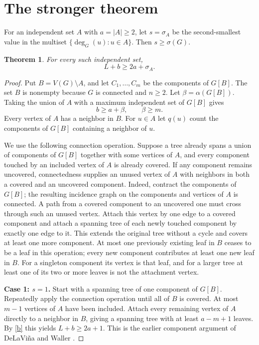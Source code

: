 \documentclass[11pt,a4paper]{article}
\newtheorem{theorem}{Theorem}
\begin{document}
\section{The stronger theorem}
For an independent set $A$ with $a=|A|\ge2$, let $s=\sigma_A$ be the second-smallest value in the multiset $\{\deg_G(u):u\in A\}$. Then $s\ge \sigma(G)$.
\begin{theorem}\label{main}
For every such independent set,
\[
 L+b\ge 2a+\sigma_A.
\]
\end{theorem}
\begin{proof}
Put $B=V(G)\setminus A$, and let $C_1,\dots,C_m$ be the components of $G[B]$. The set $B$ is nonempty because $G$ is connected and $n\ge2$. Let $\beta=\alpha(G[B])$. Taking the union of $A$ with a maximum independent set of $G[B]$ gives
\begin{equation}\label{b}
 b\ge a+\beta,\qquad \beta\ge m.
\end{equation}
Every vertex of $A$ has a neighbor in $B$. For $u\in A$ let $q(u)$ count the components of $G[B]$ containing a neighbor of $u$.

We use the following connection operation. Suppose a tree already spans a union of components of $G[B]$ together with some vertices of $A$, and every component touched by an included vertex of $A$ is already covered. If any component remains uncovered, connectedness supplies an unused vertex of $A$ with neighbors in both a covered and an uncovered component. Indeed, contract the components of $G[B]$; the resulting incidence graph on the components and vertices of $A$ is connected. A path from a covered component to an uncovered one must cross through such an unused vertex. Attach this vertex by one edge to a covered component and attach a spanning tree of each newly touched component by exactly one edge to it. This extends the original tree without a cycle and covers at least one more component. At most one previously existing leaf in $B$ ceases to be a leaf in this operation; every new component contributes at least one new leaf in $B$. For a singleton component its vertex is that leaf, and for a larger tree at least one of its two or more leaves is not the attachment vertex.

\medskip\noindent
\textbf{Case 1: $s=1$.}
Start with a spanning tree of one component of $G[B]$. Repeatedly apply the connection operation until all of $B$ is covered. At most $m-1$ vertices of $A$ have been included. Attach every remaining vertex of $A$ directly to a neighbor in $B$, giving a spanning tree with at least $a-m+1$ leaves. By \eqref{b} this yields $L+b\ge 2a+1$. This is the earlier component argument of DeLaVi\~na and Waller \cite{dw}.


\end{proof}
\end{document}
